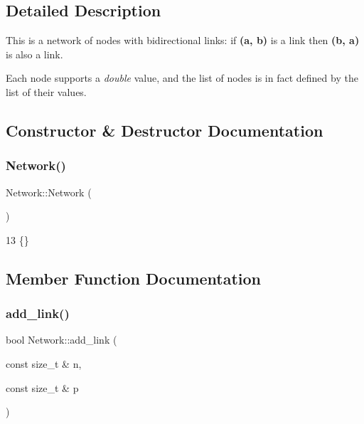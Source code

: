 \subsection{Detailed Description}
This is a network of nodes with bidirectional links\+: if {\bfseries (a, b)} is a link then {\bfseries (b, a)} is also a link.

Each node supports a {\itshape double} value, and the list of nodes is in fact defined by the list of their values. 

\subsection{Constructor \& Destructor Documentation}
\mbox{\label{classNetwork_a3cc2fb4f8fa4d507077e8da85ce5a1c8}} 
\subsubsection{\texorpdfstring{Network()}{Network()}}
{\footnotesize\ttfamily Network\+::\+Network (\begin{DoxyParamCaption}{ }\end{DoxyParamCaption})\hspace{0.3cm}{\ttfamily [inline]}}


\begin{DoxyCode}
13 \{\}
\end{DoxyCode}


\subsection{Member Function Documentation}
\mbox{\label{classNetwork_a2bc02af56e866adf0c55a2c49885551a}} 
\subsubsection{\texorpdfstring{add\+\_\+link()}{add\_link()}}
{\footnotesize\ttfamily bool Network\+::add\+\_\+link (\begin{DoxyParamCaption}\item[{const size\+\_\+t \&}]{n,  }\item[{const size\+\_\+t \&}]{p }\end{DoxyParamCaption})}

